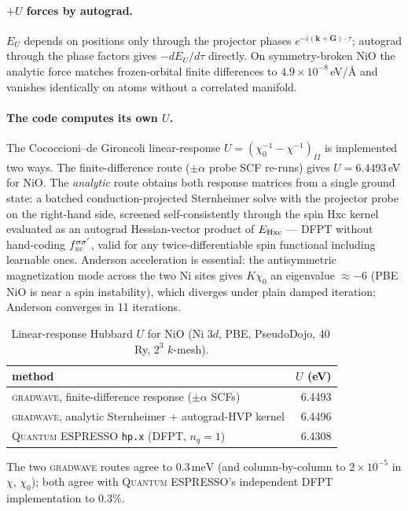 \documentclass[11pt]{article}
\newcommand{\gw}{\textsc{gradwave}}
\newcommand{\qe}{\textsc{Quantum ESPRESSO}}
\newcommand{\meV}{\,\mathrm{meV}}
\begin{document}
\paragraph{$+U$ forces by autograd.} $E_U$ depends on positions only through
the projector phases $e^{-i(\mathbf{k}+\mathbf{G})\cdot\tau}$; autograd
through the phase factors gives $-dE_U/d\tau$ directly. On symmetry-broken
NiO the analytic force matches frozen-orbital finite differences to
$4.9\times10^{-8}$\,eV/\AA{} and vanishes identically on atoms without a
correlated manifold.

\paragraph{The code computes its own $U$.} The Cococcioni--de Gironcoli
linear-response $U = (\chi_0^{-1} - \chi^{-1})_{II}$ is implemented two ways.
The finite-difference route ($\pm\alpha$ probe SCF re-runs) gives
$U = 6.4493$\,eV for NiO. The \emph{analytic} route obtains both response
matrices from a single ground state: a batched conduction-projected
Sternheimer solve with the projector probe on the right-hand side, screened
self-consistently through the spin Hxc kernel evaluated as an autograd
Hessian-vector product of $E_{\rm Hxc}$ --- DFPT without hand-coding
$f_{\rm xc}^{\sigma\sigma'}$, valid for any twice-differentiable spin
functional including learnable ones. Anderson acceleration is essential: the
antisymmetric magnetization mode across the two Ni sites gives
$K\chi_0$ an eigenvalue $\approx -6$ (PBE NiO is near a spin instability),
which diverges under plain damped iteration; Anderson converges in 11
iterations.

\begin{table}[h]\centering
\caption{Linear-response Hubbard $U$ for NiO (Ni $3d$, PBE, PseudoDojo, 40\,Ry,
$2^3$ $k$-mesh).}
\begin{tabular}{lr}
\toprule
method & $U$ (eV) \\
\midrule
\gw{}, finite-difference response ($\pm\alpha$ SCFs) & 6.4493 \\
\gw{}, analytic Sternheimer + autograd-HVP kernel & 6.4496 \\
\qe{} \texttt{hp.x} (DFPT, $n_q = 1$) & 6.4308 \\
\bottomrule
\end{tabular}
\end{table}

The two \gw{} routes agree to $0.3\meV$ (and column-by-column to
$2\times10^{-5}$ in $\chi$, $\chi_0$); both agree with \qe's independent
DFPT implementation to $0.3\%$.
\end{document}
